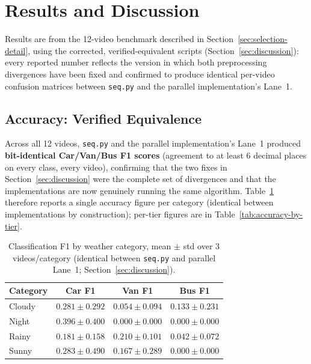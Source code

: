 \documentclass[conference]{IEEEtran}
\newcommand{\code}[1]{\texttt{#1}}
\begin{document}
\section{Results and Discussion}
\label{sec:results}
\label{sec:discussion}

Results are from the 12-video benchmark described in
Section~\ref{sec:selection-detail}, using the corrected, verified-equivalent
scripts (Section~\ref{sec:discussion}): every reported number reflects
the version in which both preprocessing divergences have been fixed and
confirmed to produce identical per-video confusion matrices between
\code{seq.py} and the parallel implementation's Lane~1.

\subsection{Accuracy: Verified Equivalence}
Across all 12 videos, \code{seq.py} and the parallel implementation's
Lane~1 produced \textbf{bit-identical Car/Van/Bus F1 scores}
(agreement to at least 6 decimal places on every class, every video),
confirming that the two fixes in Section~\ref{sec:discussion} were the
complete set of divergences and that the implementations are now
genuinely running the same algorithm. Table~\ref{tab:accuracy-by-cat}
therefore reports a single accuracy figure per category (identical
between implementations by construction); per-tier figures are in
Table~\ref{tab:accuracy-by-tier}.

\begin{table}[t]
\centering
\caption{Classification F1 by weather category, mean $\pm$ std over 3
videos/category (identical between \code{seq.py} and parallel Lane~1;
Section~\ref{sec:discussion}).}
\label{tab:accuracy-by-cat}
\footnotesize
\begin{tabular}{lccc}
\toprule
\textbf{Category} & \textbf{Car F1} & \textbf{Van F1} & \textbf{Bus F1} \\
\midrule
Cloudy & $0.281 \pm 0.292$ & $0.054 \pm 0.094$ & $0.133 \pm 0.231$ \\
Night  & $0.396 \pm 0.400$ & $0.000 \pm 0.000$ & $0.000 \pm 0.000$ \\
Rainy  & $0.181 \pm 0.158$ & $0.210 \pm 0.101$ & $0.042 \pm 0.072$ \\
Sunny  & $0.283 \pm 0.490$ & $0.167 \pm 0.289$ & $0.000 \pm 0.000$ \\
\bottomrule
\end{tabular}
\end{table}
\end{document}
